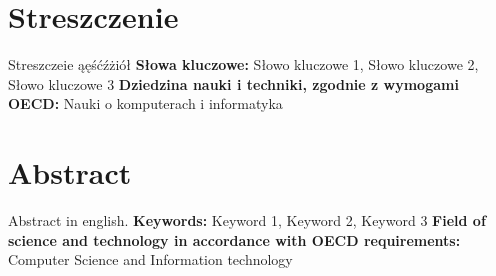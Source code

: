 \chapter*{Streszczenie}
Streszczeie ąęśćźżiół
\newline
\newline
\textbf{Słowa kluczowe:} 
Słowo kluczowe 1, Słowo kluczowe 2, Słowo kluczowe 3
\newline
\textbf{Dziedzina nauki i techniki, zgodnie z wymogami OECD: }
\newline
Nauki o komputerach i informatyka


\chapter*{Abstract}
Abstract in english.
\newline
\newline
\textbf{Keywords:}
Keyword 1, Keyword 2, Keyword 3
\newline
\textbf{Field of science and technology in accordance with OECD requirements: } \newline
Computer Science and Information technology